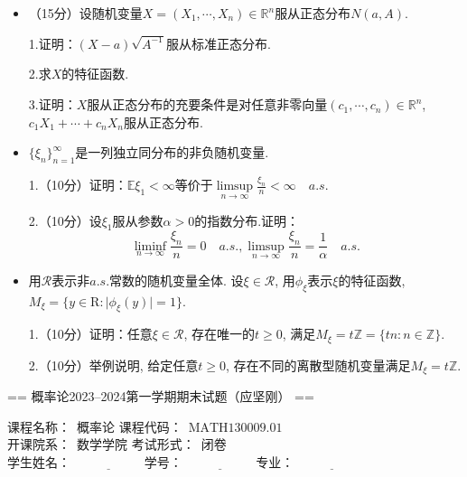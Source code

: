 \begin{itemize}
    证明：$F$连续的充分必要条件是$Y$服从参数$\alpha$的指数分布.

    \item[四.]（15分）设随机变量$X=(X_1,\cdots,X_n)\in\mathbb{R}^n$服从正态分布$N(a,A)$.\par
    1.证明：$(X-a)\sqrt{A^{-1}}$服从标准正态分布.\par
    2.求$X$的特征函数.\par
    3.证明：$X$服从正态分布的充要条件是对任意非零向量$(c_1,\cdots,c_n)\in\mathbb{R}^n$, 
    $c_1X_1+\cdots+c_nX_n$服从正态分布.

    \item[五.]$\{\xi_n\}_{n=1}^{\infty}$是一列独立同分布的非负随机变量.\par
    1.（10分）证明：$\mathbb{E}\xi_1<\infty$等价于$\limsup\limits_{n\to\infty}\frac{\xi_n}{n}<\infty \quad a.s.$\par
    2.（10分）设$\xi_1$服从参数$\alpha>0$的指数分布.证明：
    $$\liminf\limits_{n\to\infty}\frac{\xi_n}{n}=0 \quad a.s.  ,  \limsup\limits_{n\to\infty}\frac{\xi_n}{n}=\frac{1}{\alpha} \quad a.s.$$

    \item[六.]用$\mathcal{R}$表示非$a.s.$常数的随机变量全体.
    设$\xi\in\mathcal{R}$, 用$\phi_{\xi}$表示$\xi$的特征函数, $M_{\xi}=\{y\in\mathrm{R}:\vert\phi_{\xi}(y)\vert=1\}$.\par
    1.（10分）证明：任意$\xi\in\mathcal{R}$, 存在唯一的$t\geq0$, 满足$M_{\xi}=t\mathbb{Z}=\{tn:n\in\mathbb{Z}\}$.\par
    2.（10分）举例说明, 给定任意$t\geq0$, 存在不同的离散型随机变量满足$M_{\xi}=t\mathbb{Z}$.

\end{itemize}



== 概率论2023--2024第一学期期末试题（应坚刚） ==
\begin{center}

    课程名称：\ 概率论 \qquad\quad 课程代码：\ $\text{MATH130009.01}$\\
    开课院系：\ 数学学院 \qquad\quad 考试形式：\ 闭卷\\
    学生姓名：\ $\underline{\qquad\qquad\quad}$ \quad 学号：\ $\underline{\qquad\qquad\quad}$ \quad 专业：\ $\underline{\qquad\qquad\quad}$
\end{center}

